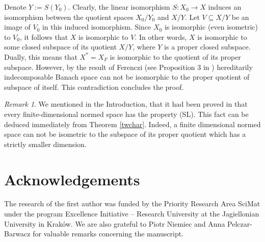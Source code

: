 \documentclass[12pt, reqno]{amsart}
\theoremstyle{definition}
\theoremstyle{remark}
\newtheorem{remark}[theorem]{Remark}
\numberwithin{equation}{section}
\begin{document}
Denote $Y:=S(Y_0)$. Clearly, the linear isomorphism $S\colon X_0 \to X$ induces an isomorphism between the quotient spaces $X_0/Y_0$ and $X/Y$. Let $V \subseteq X/Y$ be an image of $V_0$ in this induced isomorphism. Since $X_0$ is isomorphic (even isometric) to $V_0$, it follows that $X$ is isomorphic to $V$. In other words, $X$ is isomorphic to some closed subspace of its quotient $X/Y$, where $Y$ is a proper closed subspace. Dually, this means that $X^*=X_F$ is isomorphic to the quotient of its proper subspace. However, by the result of Ferenczi (see Proposition 3 in \cite{ferencziquotient}) hereditarily indecomposable Banach space can not be isomorphic to the proper quotient of subspace of itself. This contradiction concludes the proof. \qedsymbol
\begin{remark}
We mentioned in the Introduction, that it had been proved in \cite{wojcik} that every finite-dimensional normed space has the property (SL). This fact can be deduced immediately from Theorem \ref{twchar}. Indeed, a finite dimensional normed space can not be isometric to the subspace of its proper quotient which has a strictly smaller dimension.
\end{remark}


\section{Acknowledgements}

The research of the first author was funded by the Priority Research Area SciMat under the program Excellence Initiative – Research University at the Jagiellonian University in Kraków. We are also grateful to Piotr Niemiec and Anna Pelczar-Barwacz for valuable remarks concerning the manuscript.
\end{document}
